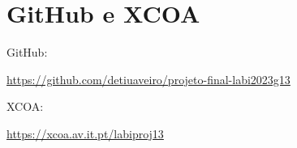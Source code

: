 \documentclass{report}
\begin{document}
\chapter*{GitHub e XCOA}

GitHub: 

\linebreak

\href{https://github.com/detiuaveiro/projeto-final-labi2023g13}{https://github.com/detiuaveiro/projeto-final-labi2023g13}

\linebreak
\bigskip
\bigskip
\bigskip

XCOA: 

\linebreak
\href{https://xcoa.av.it.pt/labiproj13}{https://xcoa.av.it.pt/labiproj13}


\printbibliography
\end{document}
